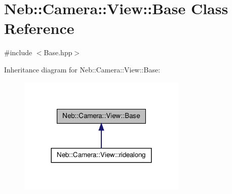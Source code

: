 \hypertarget{classNeb_1_1Camera_1_1View_1_1Base}{\section{\-Neb\-:\-:\-Camera\-:\-:\-View\-:\-:\-Base \-Class \-Reference}
\label{classNeb_1_1Camera_1_1View_1_1Base}
}


 




{\ttfamily \#include $<$\-Base.\-hpp$>$}



\-Inheritance diagram for \-Neb\-:\-:\-Camera\-:\-:\-View\-:\-:\-Base\-:\nopagebreak
\begin{figure}[H]
\begin{center}
\leavevmode
\includegraphics[width=228pt]{classNeb_1_1Camera_1_1View_1_1Base__inherit__graph}
\end{center}
\end{figure}
